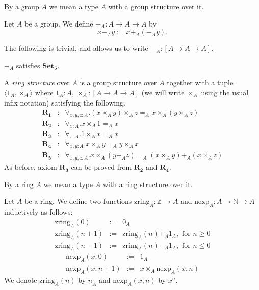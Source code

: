 \documentclass[numreferences]{kluwer}
\newcommand{\Z}{{\mathbb Z}}
\newcommand{\zring}{\ensuremath{\mathrm{zring}}}
\newcommand{\nexp}{\ensuremath{\mathrm{nexp}}}
\newcommand{\nat}{{\mathbb N}}
\newcommand{\axiom}[1]{\ensuremath{\mathbf{#1}}}
\begin{document}
\begin{article}
\begin{definition}
By a group $A$ we mean a type $A$ with a group structure over it.
\end{definition}

\begin{definition} Let $A$ be a group.  We define $-_A:A\to A\to A$ by
\[x-_A y:= x+_A(-_A y).\]
\end{definition}

The following is trivial, and allows us to write $-_A:[A\to A\to A]$.

\begin{proposition} $-_A$ satisfies \axiom{Set_5}.
\end{proposition}

\begin{definition}
A \emph{ring structure} over $A$ is a group structure over $A$ together with
a tuple $\langle 1_A,\times_A\rangle$ where $1_A:A$, $\times_A:[A\to
A\to A]$ (we will write $\times_A$ using the usual infix notation)
satisfying the following.
\begin{eqnarray*}
\axiom{R_1} & : & \forall_{x,y,z:A}.
 (x\times_A y)\times_A z=_A x\times_A(y\times_A z) \\
\axiom{R_2} & : & \forall_{x:A}.x\times_A 1=_A x\\
\axiom{R_3} & : & \forall_{x:A}.1\times_A x=_A x\\
\axiom{R_4} & : & \forall_{x,y:A}.x\times_A y=_A y\times_A x\\
\axiom{R_5} & : & \forall_{x,y,z:A}.
 x\times_A(y+_A z)=_A(x\times_A y)+_A(x\times_A z)
\end{eqnarray*}
As before, axiom \axiom{R_3} can be proved from \axiom{R_2} and
\axiom{R_4}.

By a ring $A$ we mean a type $A$ with a ring structure over it.
\end{definition}

\begin{definition} Let $A$ be a ring.  We define two functions
$\zring_A:\Z\to A$ and $\nexp_A:A\to\nat\to A$ inductively as follows:
\begin{eqnarray}
\label{zring:0}
 \zring_A(0) & := & 0_A\\
\label{zring:pos}
 \zring_A(n+1) & := & \zring_A(n)+_A 1_A,\mbox{ for $n\geq 0$}\\
\label{zring:neg}
 \zring_A(n-1) & := & \zring_A(n)-_A 1_A,\mbox{ for $n\leq 0$}
\end{eqnarray}
\begin{eqnarray}
\label{nexp:zero}
 \nexp_A(x,0) & := & 1_A\\
\label{nexp:suc}
 \nexp_A(x,n+1) & := & x\times_A\nexp_A(x,n)
\end{eqnarray}
We denote $\zring_A(n)$ by $\underline n_A$ and $\nexp_A(x,n)$ by $x^n$.
\end{definition}


\end{article}
\end{document}
